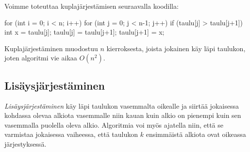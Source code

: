 Voimme toteuttaa kuplajärjestämisen seuraavalla koodilla:

\begin{code}
for (int i = 0; i < n; i++) {
    for (int j = 0; j < n-1; j++) {
        if (taulu[j] > taulu[j+1]) {
            int x = taulu[j];
            taulu[j] = taulu[j+1];
            taulu[j+1] = x;
        }
    }
}
\end{code}

Kuplajärjestäminen muodostuu $n$ kierroksesta,
joista jokainen käy läpi taulukon,
joten algoritmi vie aikaa $O(n^2)$.

\subsection{Lisäysjärjestäminen}

\emph{Lisäysjärjestäminen} käy läpi taulukon vasemmalta oikealle
ja siirtää jokaisessa kohdassa olevaa alkiota vasemmalle
niin kauan kuin alkio on pienempi kuin sen vasemmalla
puolella oleva alkio.
Algoritmia voi myös ajatella niin,
että se varmistaa jokaisessa vaiheessa,
että taulukon $k$ ensimmäistä alkiota ovat oikeassa järjestyksessä.

